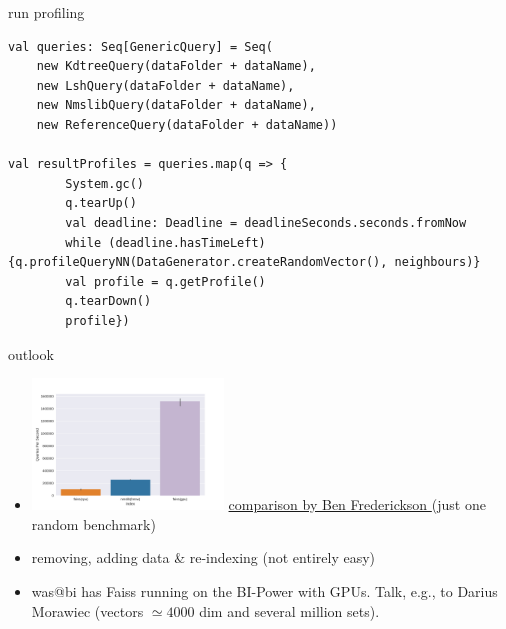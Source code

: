 \documentclass[xcolor=dvipsnames, aspectratio=1610]{beamer}
\newcommand{\gr}[1]{{\color{grcol}#1}}
\newcommand{\citeWork}[1]{ {\scriptsize{\color{Refcol} #1  \color{Black}}}}
\begin{document}
\begin{frame}[fragile]{run profiling} 
\linespread{1}\tiny{
\begin{minipage}{1.05\textwidth}  
\begin{lstlisting}[style=myScalastyle]
val queries: Seq[GenericQuery] = Seq(
	new KdtreeQuery(dataFolder + dataName),
	new LshQuery(dataFolder + dataName),
	new NmslibQuery(dataFolder + dataName),
	new ReferenceQuery(dataFolder + dataName))

val resultProfiles = queries.map(q => {
		System.gc()
		q.tearUp()
		val deadline: Deadline = deadlineSeconds.seconds.fromNow
		while (deadline.hasTimeLeft) {q.profileQueryNN(DataGenerator.createRandomVector(), neighbours)}
		val profile = q.getProfile()
		q.tearDown()
		profile})
\end{lstlisting}
\end{minipage}}
\end{frame}



\begin{frame}{outlook } 
\linespread{1}\small{
\begin{minipage}{0.99\textwidth}  

\begin{itemize}
\item \includegraphics[width=0.4\textwidth]{Figures/faiss_gpu.png} \href{https://www.benfrederickson.com/approximate-nearest-neighbours-for-recommender-systems/}{\citeWork{comparison by Ben Frederickson}} \gr{(just one random benchmark)}
\item removing, adding data \& re-indexing (not entirely easy)
\item was@bi has Faiss running on the BI-Power with GPUs. Talk, e.g., to Darius Morawiec (vectors $\simeq 4000$ dim and several million sets).
\end{itemize}
\end{minipage}
}
\end{frame}
\end{document}
